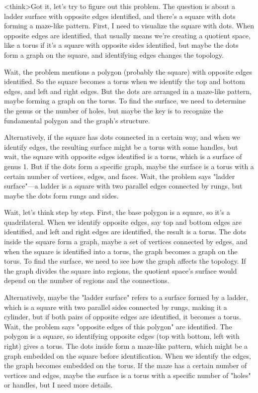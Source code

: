 <think>Got it, let's try to figure out this problem. The question is about a ladder surface with opposite edges identified, and there's a square with dots forming a maze-like pattern. First, I need to visualize the square with dots. When opposite edges are identified, that usually means we're creating a quotient space, like a torus if it's a square with opposite sides identified, but maybe the dots form a graph on the square, and identifying edges changes the topology.

Wait, the problem mentions a polygon (probably the square) with opposite edges identified. So the square becomes a torus when we identify the top and bottom edges, and left and right edges. But the dots are arranged in a maze-like pattern, maybe forming a graph on the torus. To find the surface, we need to determine the genus or the number of holes, but maybe the key is to recognize the fundamental polygon and the graph's structure.

Alternatively, if the square has dots connected in a certain way, and when we identify edges, the resulting surface might be a torus with some handles, but wait, the square with opposite edges identified is a torus, which is a surface of genus 1. But if the dots form a specific graph, maybe the surface is a torus with a certain number of vertices, edges, and faces. Wait, the problem says "ladder surface"—a ladder is a square with two parallel edges connected by rungs, but maybe the dots form rungs and sides.

Wait, let's think step by step. First, the base polygon is a square, so it's a quadrilateral. When we identify opposite edges, say top and bottom edges are identified, and left and right edges are identified, the result is a torus. The dots inside the square form a graph, maybe a set of vertices connected by edges, and when the square is identified into a torus, the graph becomes a graph on the torus. To find the surface, we need to see how the graph affects the topology. If the graph divides the square into regions, the quotient space's surface would depend on the number of regions and the connections.

Alternatively, maybe the "ladder surface" refers to a surface formed by a ladder, which is a square with two parallel sides connected by rungs, making it a cylinder, but if both pairs of opposite edges are identified, it becomes a torus. Wait, the problem says "opposite edges of this polygon" are identified. The polygon is a square, so identifying opposite edges (top with bottom, left with right) gives a torus. The dots inside form a maze-like pattern, which might be a graph embedded on the square before identification. When we identify the edges, the graph becomes embedded on the torus. If the maze has a certain number of vertices and edges, maybe the surface is a torus with a specific number of "holes" or handles, but I need more details.

